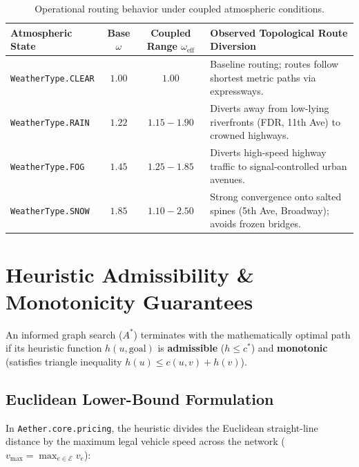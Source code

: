 \documentclass[10pt,a4paper]{article}
\begin{document}
\begin{table}[H]
\centering
\sffamily\scriptsize
\renewcommand{\arraystretch}{1.12}
\begin{tabularx}{\textwidth}{l c c X}
\toprule
\textbf{Atmospheric State} & \textbf{Base $\omega$} & \textbf{Coupled Range $\omega_{\text{eff}}$} & \textbf{Observed Topological Route Diversion} \\
\midrule
\texttt{WeatherType.CLEAR} & $1.00$ & $1.00$ & Baseline routing; routes follow shortest metric paths via expressways. \\
\texttt{WeatherType.RAIN}  & $1.22$ & $1.15 - 1.90$ & Diverts away from low-lying riverfronts (FDR, 11th Ave) to crowned highways. \\
\texttt{WeatherType.FOG}   & $1.45$ & $1.25 - 1.85$ & Diverts high-speed highway traffic to signal-controlled urban avenues. \\
\texttt{WeatherType.SNOW}  & $1.85$ & $1.10 - 2.50$ & Strong convergence onto salted spines (5th Ave, Broadway); avoids frozen bridges. \\
\bottomrule
\end{tabularx}
\caption{Operational routing behavior under coupled atmospheric conditions.}
\label{tab:weather_coupling}
\end{table}

\newpage
\section{Heuristic Admissibility \& Monotonicity Guarantees}

An informed graph search ($A^*$) terminates with the mathematically optimal path if its heuristic function $h(u, \text{goal})$ is \textbf{admissible} ($h \le c^*$) and \textbf{monotonic} (satisfies triangle inequality $h(u) \le c(u, v) + h(v)$).

\subsection{Euclidean Lower-Bound Formulation}
In \texttt{Aether.core.pricing}, the heuristic divides the Euclidean straight-line distance by the maximum legal vehicle speed across the network ($v_{\max} = \max_{e \in \mathcal{E}} v_e$):
\end{document}
